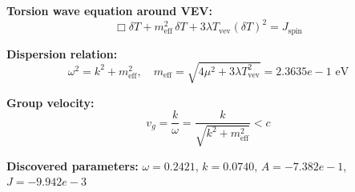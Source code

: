 
\textbf{Torsion wave equation around VEV:}
\begin{equation}
  \Box \delta T + m_{\text{eff}}^2 \, \delta T + 3\lambda T_{\text{vev}} (\delta T)^2 = J_{\text{spin}}
\end{equation}

\textbf{Dispersion relation:}
\begin{equation}
  \omega^2 = k^2 + m_{\text{eff}}^2, \quad
  m_{\text{eff}} = \sqrt{4\mu^2 + 3\lambda T_{\text{vev}}^2} = 2.3635e-1 \text{ eV}
\end{equation}

\textbf{Group velocity:}
\begin{equation}
  v_g = \frac{k}{\omega} = \frac{k}{\sqrt{k^2 + m_{\text{eff}}^2}} < c
\end{equation}

\textbf{Discovered parameters:}
$\omega = 0.2421$, \quad
$k = 0.0740$, \quad
$A = -7.382e-1$, \quad
$J = -9.942e-3$